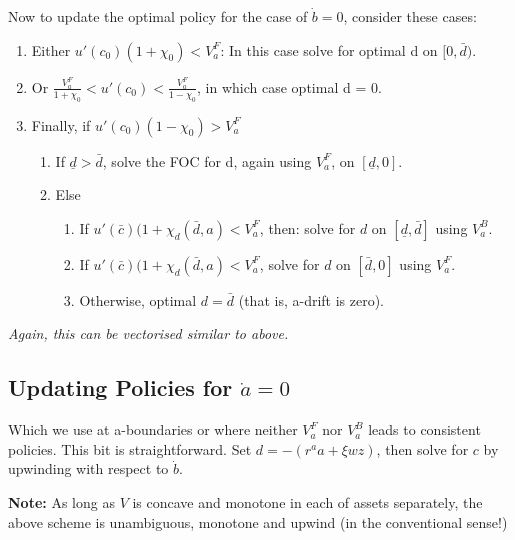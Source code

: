 \documentclass[11pt]{article}
\begin{document}
Now to update the optimal policy for the case of \(\dot{b}=0\), consider these cases:
\begin{enumerate}
\item Either \(u'(c_0)(1+\chi_0) < V_a^{F}\): In this case solve for optimal d on \([0,\bar{d})\).
\item Or \(\frac{V_a^{F}}{1+\chi_0} < u'(c_0) < \frac{V_a^{F}}{1-\chi_0}\), in which case optimal d = 0.
\item Finally, if \(u'(c_0)(1-\chi_0) > V_a^{F}\)
\begin{enumerate}
\item If \(\underline{d} > \bar{d}\), solve the FOC for d, again using \(V_a^F\), on \([\underline{d},0]\).
\item Else
\begin{enumerate}
\item If \(u'(\bar{c})(1+\chi_d(\bar{d},a) < V_a^F\), then: solve for \(d\) on \([ \underline{d}, \bar{d} ]\) using \(V_a^B\).
\item If \(u'(\bar{c})(1+\chi_d(\bar{d},a) < V_a^F\), solve for \(d\) on \([ \bar{d}, 0]\) using \(V_a^F\).
\item Otherwise, optimal \(d = \bar{d}\) (that is, a-drift is zero).
\end{enumerate}
\end{enumerate}
\end{enumerate}

\emph{Again, this can be vectorised similar to above.}

\subsection{Updating Policies for \(\dot{a}=0\)}
\label{sec:orgad3b140}
Which we use at a-boundaries or where neither \(V_a^F\) nor \(V_a^B\) leads to consistent policies. This bit is straightforward. Set \(d = - (r^a a + \xi w z)\), then solve for \(c\) by upwinding with respect to \(\dot{b}\).

\textbf{Note:} As long as \(V\) is concave and monotone in each of assets separately, the above scheme is unambiguous, monotone and upwind (in the conventional sense!)


\newpage


\end{document}

